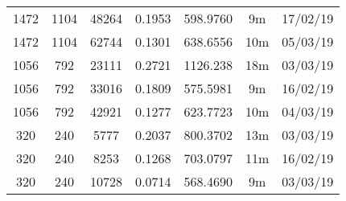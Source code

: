 \begin{center}
\begin{tabular}{ c c c | c | c c c }
  1472 & 1104 & 48264 & 0.1953 & 598.9760 & 9m & 17/02/19 \\
  1472 & 1104 & 62744 & 0.1301 & 638.6556 & 10m & 05/03/19 \\
  1056 & 792 & 23111 & 0.2721 & 1126.238 & 18m & 03/03/19 \\
  1056 & 792 & 33016 & 0.1809 & 575.5981 & 9m & 16/02/19 \\
  1056 & 792 & 42921 & 0.1277 & 623.7723 & 10m & 04/03/19 \\
  320 & 240 & 5777 & 0.2037 & 800.3702 & 13m & 03/03/19 \\
  320 & 240 & 8253 & 0.1268 & 703.0797 & 11m & 16/02/19 \\
  320 & 240 & 10728 & 0.0714 & 568.4690 & 9m & 03/03/19 \\
  \end{tabular}
  \end{center}